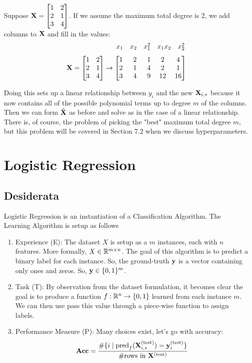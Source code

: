 \begin{example}
Suppose $\MX = \begin{bmatrix} 1&2\\2&1\\3&4 \end{bmatrix}$. If we assume the maximum total degree is 2, we add columns to $\MX$ and fill in the values:
$$ \phantom{.} \hspace{24mm} \begin{array}{*{5}{c}} x_1 & x_2 & x_1^2 & x_1 x_2 & x_2^2 \end{array} $$
\vspace{-25pt}
$$ \MX = \begin{bmatrix} 1&2\\2&1\\3&4 \end{bmatrix} \to
\begin{bmatrix}
1   &\phantom{..}2  &\phantom{..}1  &\phantom{.}2   &\phantom{.}4\\
2   &\phantom{..}1  &\phantom{..}4  &\phantom{.}2   &\phantom{.}1\\
3   &\phantom{..}4  &\phantom{..}9  &\phantom{.}12  &\phantom{.}16
\end{bmatrix} $$
\end{example}

Doing this sets up a linear relationship between $y_i$ and the new $\MX_{i, \ast}$ because it now contains all of the possible polynomial terms up to degree $m$ of the columns. Then we can form $\hat{\MX}$ as before and solve as in the case of a linear relationship. There is, of course, the problem of picking the "best" maximum total degree $m$, but this problem will be covered in Section 7.2 when we discuss hyperparameters.

\section{Logistic Regression}
\subsection{Desiderata}
Logistic Regression is an instantiation of a Classification Algorithm. The Learning Algorithm is setup as follows
\begin{enumerate}
    \item Experience (E): The dataset $X$ is setup as a $m$ instances, each with $n$ features. More formally, $X \in \R^{m \times n}$. The goal of this algorithm is to predict a binary label for each instance. So, the ground-truth $\vy$ is a vector containing only ones and zeros. So, $\vy \in \{0, 1\}^{m}$. 
    \item Task (T): By observation from the dataset formulation, it becomes clear the goal is to produce a function $f :  \R^{n} \to \{0, 1\}$ learned from each instance $m$. We can then use pass this value through a piece-wise function to assign labels. 
    \item Performance Measure (P): Many choices exist, let's go with accuracy:
    $$\textbf{Acc} = \frac {\#\{i \mid \text{pred}_f(\MX_{i, *}^{\text{(test)}}) = \vy_i^{\text{(test)}}\}}{\# \text{rows} \  \text{in} \ \MX^\text{(test)}}$$
\end{enumerate}

